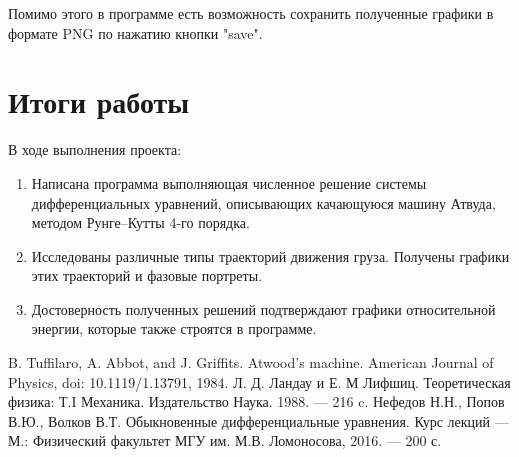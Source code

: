 \documentclass[12pt]{article}
\numberwithin{equation}{section}
\begin{document}
Помимо этого в программе есть возможность сохранить полученные графики в формате PNG по нажатию кнопки "save".
\section{Итоги работы}
В ходе выполнения проекта: 
\begin{enumerate}
	\item Написана программа выполняющая численное решение системы дифференциальных уравнений, описывающих качающуюся машину Атвуда, методом Рунге--Кутты 4-го порядка.
	\item Исследованы различные типы траекторий движения груза. Получены графики этих траекторий и фазовые портреты.
	\item Достоверность полученных решений подтверждают графики относительной энергии, которые также строятся в программе.
\end{enumerate}
\clearpage

\begin{thebibliography}{3}
B. Tuffilaro, A. Abbot,  and J. Griffits. Atwood’s machine. American Journal of Physics, doi: 10.1119/1.13791, 1984.
Л. Д. Ландау и Е. М Лифшиц. Теоретическая физика: Т.I Механика. Издательство Наука. 1988. --- 216 c.
Нефедов Н.Н., Попов В.Ю., Волков В.Т. Обыкновенные дифференциальные уравнения. Курс лекций — М.: Физический факультет МГУ им. М.В. Ломоносова, 2016. — 200 с.
\end{thebibliography}

\clearpage
\end{document}
